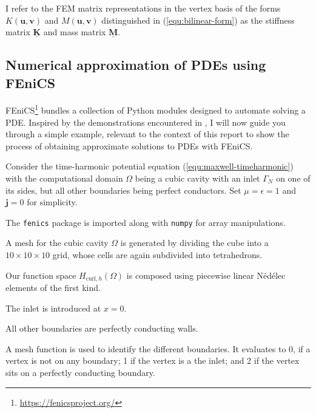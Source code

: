 \documentclass[11pt, a4paper]{article}
\begin{document}
I refer to the \acrshort{FEM} matrix representations in the vertex basis of the forms
$K(\mathbf{u}, \mathbf{v})$ and $M(\mathbf{u}, \mathbf{v})$ distinguished in
(\ref{equ:bilinear-form}) as the
stiffness matrix $\mathbf{\underline{K}}$ and mass matrix $\mathbf{\underline{M}}$.

\subsection{Numerical approximation of \acrshort{PDE}s using FEniCS}
\label{subsec:fem-demo}

FEniCS\footnote{\url{https://fenicsproject.org/}} bundles a collection of Python
modules designed to automate solving a \acrfull{PDE}.
Inspired by the demonstrations encountered in \cite{fenics}, I will now guide you
through a simple example, relevant to the context of this report to
show the process of obtaining approximate solutions to \acrshort{PDE}s with FEniCS.

Consider the time-harmonic potential equation (\ref{equ:maxwell-timeharmonic})
with the computational domain $\Omega$ being a cubic cavity with an inlet $\Gamma_N$
on one of its sides, but all other boundaries being perfect conductors.
Set $\mu = \epsilon = 1$ and $\mathbf{j} = 0$ for simplicity.

The \texttt{fenics} package is imported along with \texttt{numpy} for array manipulations.


A mesh for the cubic cavity $\Omega$ is generated by dividing the cube into a
$10\times10\times10$ grid, whose cells are again subdivided into tetrahedrons.


Our function space $H_{\textrm{curl},h}(\Omega)$ is composed using piecewise
linear Nédélec elements of the first kind.


The inlet is introduced at $x = 0$.


All other boundaries are perfectly conducting walls.


A mesh function is used to identify the different boundaries. It evaluates to
0, if a vertex is not on any boundary; 1 if the vertex is a the inlet; and 2 if
the vertex sits on a perfectly conducting boundary.

\end{document}
